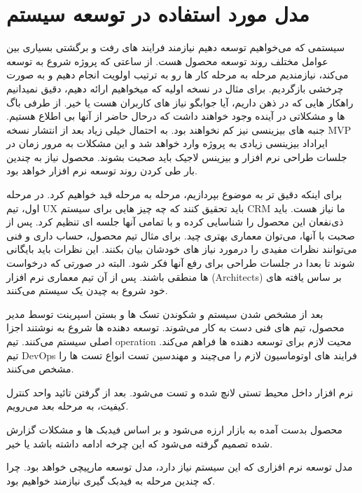 \newpage
\section{مدل مورد استفاده در توسعه سیستم}
سیستمی که می‌خواهیم توسعه دهیم نیازمند فرایند های رفت و برگشتی بسیاری بین عوامل مختلف روند توسعه محصول هست. از ساعتی که پروژه شروع به توسعه می‌کند، 
نیازمندیم مرحله به مرحله کار ها رو به ترتیب اولویت انجام دهیم و به صورت چرخشی بازگردیم. برای مثال در نسخه اولیه که میخواهیم ارائه دهیم، دقیق نمیدانیم راهکار هایی که
در ذهن داریم، آیا جوابگو نیاز های کاربران هست یا خیر. از طرفی باگ ها و مشکلاتی در آینده وجود خواهند داشت که درحال حاضر از آنها بی اطلاع  هستیم.
جنبه های بیزینسی نیز کم نخواهند بود. به احتمال خیلی زیاد بعد از انتشار نسخه MVP ایراداد بیزینسی زیادی به پروژه وارد خواهد شد و این مشکلات به مرور زمان
در جلسات طراحی نرم افزار و بیزینس لاجیک باید صحبت بشوند. محصول نیاز به چندین بار طی کردن روند توسعه نرم افزار خواهد بود.

برای اینکه دقیق تر به موضوع بپردازیم، مرحله به مرحله قید خواهیم کرد. در مرحله اول، تیم UX باید تحقیق کنند که چه چیز هایی برای سیستم CRM ما نیاز هست.
باید ذی‌نفعان این محصول را شناسایی کرده و با تمامی آنها جلسه ای تنظیم کرد. پس از صحبت با آنها، می‌توان معماری بهتری چید.
برای مثال تیم محصول، حساب داری و فنی می‌توانند نظرات مفیدی را درمورد نیاز های خودشان بیان بکنند. این نظرات باید بایگانی شوند تا بعدا در جلسات طراحی برای 
رفع آنها فکر شود. البته در صورتی که درخواست ها منطقی باشند.
پس از آن تیم معماری نرم افزار (Architects) بر ساس یافته های خود شروع به چیدن یک سیستم می‌کنند.

بعد از مشخص شدن سیستم و شکوندن تسک ها و بستن اسپرینت توسط مدیر محصول، تیم های فنی دست به کار می‌شوند. توسعه دهنده ها شروع به نوشتند اجزا اصلی 
سیستم می‌کنند. تیم operation محیت لازم برای توسعه دهنده ها فراهم می‌کند.
تیم DevOps فرایند های اوتوماسیون لازم را می‌چیند و مهندسین تست انواع تست ها را مشخص می‌کنند.

نرم افزار داخل محیط تستی لانچ شده و تست می‌شود. بعد از گرفتن تائید واحد کنترل کیفیت، به مرحله بعد می‌رویم.

محصول بدست آمده به بازار ارزه می‌شود و بر اساس فیدبک ها و مشکلات گزارش شده تصمیم گرفته می‌شود که این چرخه ادامه داشته باشد یا خیر.

مدل توسعه نرم افزاری که این سیستم نیاز دارد، مدل توسعه مارپیچی خواهد بود. چرا که چندین مرحله به فیدبک گیری نیازمند خواهیم بود.


